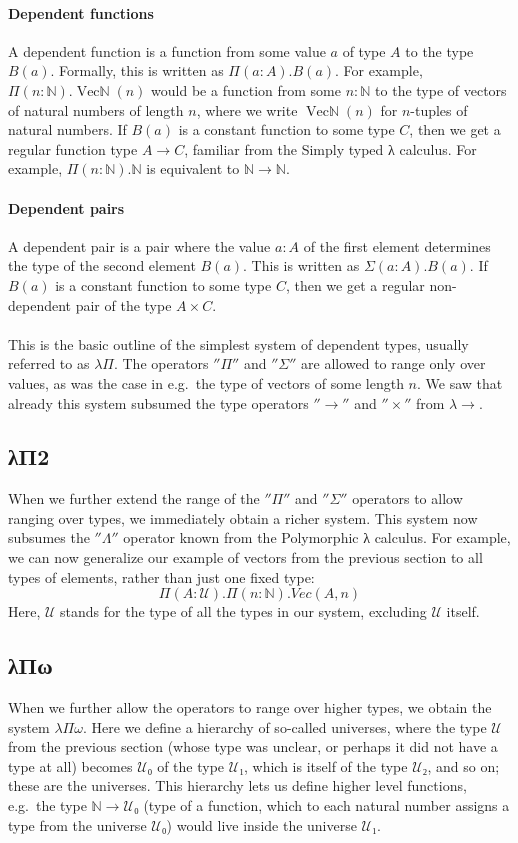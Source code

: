 \documentclass[12pt]{article}
\begin{document}
\paragraph{Dependent functions}
A dependent function is a function from some value $a$ of type $A$ to the type $B(a)$. Formally, this is written as $Π(a:A).B(a)$. For example, $Π(n:ℕ).\operatorname{Vecℕ}(n)$ would be a function from some $n:ℕ$ to the type of vectors of natural numbers of length $n$, where we write $\operatorname{Vecℕ}(n)$ for $n$-tuples of natural numbers. If $B(a)$ is a constant function to some type $C$, then we get a regular function type $A → C$, familiar from the Simply typed λ calculus. For example, $Π(n:ℕ).ℕ $ is equivalent to $ℕ → ℕ$.

\paragraph{Dependent pairs}
A dependent pair is a pair where the value $a:A$ of the first element determines the type of the second element $B(a)$. This is written as $Σ(a:A).B(a)$. If $B(a)$ is a constant function to some type $C$, then we get a regular non-dependent pair of the type $A × C$.

\paragraph{}
This is the basic outline of the simplest system of dependent types, usually referred to as $λΠ$. The operators $''Π''$ and $''Σ''$ are allowed to range only over values, as was the case in e.g.~the type of vectors of some length $n$. We saw that already this system subsumed the type operators $''→''$ and $''×''$ from $λ→$.

\subsection{λΠ2}
When we further extend the range of the $''Π''$ and $''Σ''$ operators to allow ranging over types, we immediately obtain a richer system. This system now subsumes the $''Λ''$ operator known from the Polymorphic λ calculus. For example, we can now generalize our example of vectors from the previous section to all types of elements, rather than just one fixed type:
$$ Π(A:\mathcal{U}).Π(n:ℕ).Vec(A, n) $$
Here, $\mathcal{U}$ stands for the type of all the types in our system, excluding $\mathcal{U}$ itself.

\subsection{λΠω}
\label{universes}
When we further allow the operators to range over higher types, we obtain the system $λΠω$. Here we define a hierarchy of so-called universes, where the type $\mathcal{U}$ from the previous section (whose type was unclear, or perhaps it did not have a type at all) becomes $\mathcal{U}₀$ of the type $\mathcal{U}₁$, which is itself of the type $\mathcal{U}₂$, and so on; these are the universes. This hierarchy lets us define higher level functions, e.g.~the type $ℕ → \mathcal{U}₀$ (type of a function, which to each natural number assigns a type from the universe $\mathcal{U}₀$) would live inside the universe $\mathcal{U}₁$.
\end{document}
